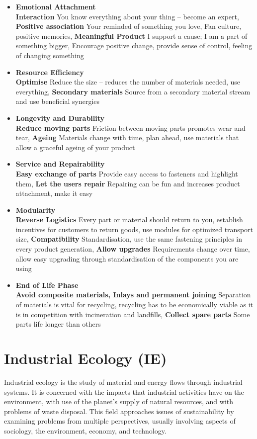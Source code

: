 \documentclass[11pt]{article}
\theoremstyle{definition}
\begin{document}
\begin{itemize}
	\item \textbf{Emotional Attachment}\\
	\textbf{Interaction} You know everything about your thing -- become an expert, \textbf{Positive association} Your reminded of something you
	love, Fan culture, positive memories, \textbf{Meaningful Product} I support a cause; I am a part of something bigger, Encourage positive change, provide sense of control, feeling of changing something
	\item \textbf{Resource Efficiency}\\
	\textbf{Optimise} Reduce the size -- reduces the number of materials needed, use everything, \textbf{Secondary materials} Source from a secondary material stream and use beneficial synergies
	\item \textbf{Longevity and Durability}\\
	\textbf{Reduce moving parts} Friction between moving parts promotes wear and tear, \textbf{Ageing} Materials change with time, plan ahead, use materials that allow a graceful ageing of your product
	\item \textbf{Service and Repairability}\\
	\textbf{Easy exchange of parts} Provide easy access to fasteners and highlight them, \textbf{Let the users repair} Repairing can be fun and increases product attachment, make it easy
	\item \textbf{Modularity}\\
	\textbf{Reverse Logistics} Every part or material should return to you, establish incentives for customers to return goods, use modules for optimized transport size, \textbf{Compatibility}
	Standardisation, use the same fastening principles in every product generation, \textbf{Allow upgrades} Requirements change over time, allow easy upgrading through standardisation of the components you are using
	\item \textbf{End of Life Phase}\\
	\textbf{Avoid composite materials, Inlays and permanent joining} Separation of materials is vital for recycling, recycling has to be economically viable as it is in competition with incineration and landfills, \textbf{Collect spare parts} Some parts life longer than others
\end{itemize}

\section{Industrial Ecology (IE)}
Industrial ecology is the study of material and energy flows through industrial systems. It is concerned with the impacts that industrial activities have on the environment, with use of the planet's supply of natural resources, and with problems of waste disposal. This field approaches issues of sustainability by examining problems from multiple perspectives, usually involving aspects of sociology, the environment, economy, and technology.
\end{document}

